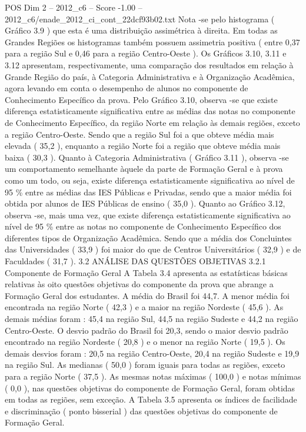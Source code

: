 \begin{textsample}{POS Dim 2 – 2012\_c6 – Score -1.00 – 2012\_c6/enade\_2012\_ci\_cont\_22dcf93b02.txt}
Nota -se pelo histograma ( Gráfico 3.9 ) que esta é uma distribuição assimétrica à direita.
Em todas as Grandes Regiões os histogramas também possuem assimetria positiva ( entre 0,37 para a região Sul e 0,46 para a região Centro-Oeste ).
Os Gráficos 3.10, 3.11 e 3.12 apresentam, respectivamente, uma comparação dos resultados em relação à Grande Região do país, à Categoria Administrativa e à Organização Acadêmica, agora levando em conta o desempenho de alunos no componente de Conhecimento Específico da prova.
Pelo Gráfico 3.10, observa -se que existe diferença estatisticamente significativa entre as médias das notas no componente de Conhecimento Específico, da região Norte em relação às demais regiões, exceto a região Centro-Oeste.
Sendo que a região Sul foi a que obteve média mais elevada ( 35,2 ), enquanto a região Norte foi a região que obteve média mais baixa ( 30,3 ).
Quanto à Categoria Administrativa ( Gráfico 3.11 ), observa -se um comportamento semelhante àquele da parte de Formação Geral e à prova como um todo, ou seja, existe diferença estatisticamente significativa ao nível de 95 \% entre as médias das IES Públicas e Privadas, sendo que a maior média foi obtida por alunos de IES Públicas de ensino ( 35,0 ).
Quanto ao Gráfico 3.12, observa -se, mais uma vez, que existe diferença estatisticamente significativa ao nível de 95 \% entre as notas no componente de Conhecimento Específico dos diferentes tipos de Organização Acadêmica.
Sendo que a média dos Concluintes das Universidades ( 33,9 ) foi maior do que de Centros Universitários ( 32,9 ) e de Faculdades ( 31,7 ). 3.2 ANÁLISE DAS QUESTÕES OBJETIVAS 3.2.1 Componente de Formação Geral A Tabela 3.4 apresenta as estatísticas básicas relativas às oito questões objetivas do componente da prova que abrange a Formação Geral dos estudantes.
A média do Brasil foi 44,7.
A menor média foi encontrada na região Norte ( 42,3 ) e a maior na região Nordeste ( 45,6 ).
As demais médias foram : 45,4 na região Sul, 44,5 na região Sudeste e 44,2 na região Centro-Oeste.
O desvio padrão do Brasil foi 20,3, sendo o maior desvio padrão encontrado na região Nordeste ( 20,8 ) e o menor na região Norte ( 19,5 ).
Os demais desvios foram : 20,5 na região Centro-Oeste, 20,4 na região Sudeste e 19,9 na região Sul.
As medianas ( 50,0 ) foram iguais para todas as regiões, exceto para a região Norte ( 37,5 ).
As mesmas notas máximas ( 100,0 ) e notas mínimas ( 0,0 ), nas questões objetivas do componente de Formação Geral, foram obtidas em todas as regiões, sem exceção.
A Tabela 3.5 apresenta os índices de facilidade e discriminação ( ponto bisserial ) das questões objetivas do componente de Formação Geral.

\end{textsample}

